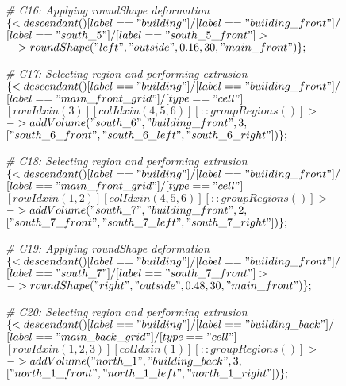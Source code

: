 \noindent \textit{\# C16: Applying roundShape deformation}\\
$\{< descendant() [label=="building"] / [label=="building\_front"] / $\\
$[label=="south\_5"] / [label=="south\_5\_front"] > $\\
$-> roundShape("left", "outside", 0.16, 30, "main\_front")\};$

\noindent \textit{\# C17: Selecting region and performing extrusion}\\
$\{< descendant() [label=="building"] / [label=="building\_front"] / $\\
$[label=="main\_front\_grid"] / [type=="cell"] $\\
$[rowIdx in (3)] [colIdx in (4, 5, 6)] [::groupRegions()] > $\\
$-> addVolume("south\_6", "building\_front", 3, $\\
$["south\_6\_front", "south\_6\_left", "south\_6\_right"])\};$

\noindent \textit{\# C18: Selecting region and performing extrusion}\\
$\{< descendant() [label=="building"] / [label=="building\_front"] / $\\
$[label=="main\_front\_grid"] / [type=="cell"] $\\
$[rowIdx in (1, 2)] [colIdx in (4, 5, 6)] [::groupRegions()] > $\\
$-> addVolume("south\_7", "building\_front", 2, $\\
$["south\_7\_front", "south\_7\_left", "south\_7\_right"])\};$

\noindent \textit{\# C19: Applying roundShape deformation}\\
$\{< descendant() [label=="building"] / [label=="building\_front"] / $\\
$[label=="south\_7"] / [label=="south\_7\_front"] > $\\
$-> roundShape("right", "outside", 0.48, 30, "main\_front")\};$

\noindent \textit{\# C20: Selecting region and performing extrusion}\\
$\{< descendant() [label=="building"] / [label=="building\_back"] / $\\
$[label=="main\_back\_grid"] / [type=="cell"] $\\
$[rowIdx in (1, 2, 3)] [colIdx in (1)] [::groupRegions()] > $\\
$-> addVolume("north\_1", "building\_back", 3, $\\
$["north\_1\_front", "north\_1\_left", "north\_1\_right"])\};$

